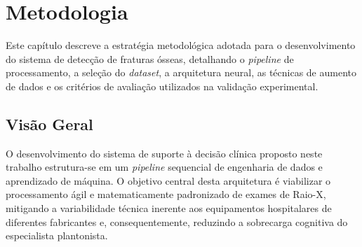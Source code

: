 \documentclass[12pt,oneside,a4paper,chapter=TITLE,section=TITLE,sumario=tradicional]{abntex2}
\begin{document}
\begin{table}[H]
\centering
\caption{COMPARAÇÃO DE TRABALHOS RELACIONADOS COM FOCO EM FRATURAS E DADOS DICOM}
\label{tab:trabalhos_resumidos}
\end{table}

\chapter{Metodologia}
\label{cap:metodologia}

Este capítulo descreve a estratégia metodológica adotada para o desenvolvimento do sistema de detecção de fraturas ósseas, detalhando o \textit{pipeline} de processamento, a seleção do \textit{dataset}, a arquitetura neural, as técnicas de aumento de dados e os critérios de avaliação utilizados na validação experimental.

\section{Visão Geral}

O desenvolvimento do sistema de suporte à decisão clínica proposto neste trabalho estrutura-se em um \textit{pipeline} sequencial de engenharia de dados e aprendizado de máquina. O objetivo central desta arquitetura é viabilizar o processamento ágil e matematicamente padronizado de exames de Raio-X, mitigando a variabilidade técnica inerente aos equipamentos hospitalares de diferentes fabricantes e, consequentemente, reduzindo a sobrecarga cognitiva do especialista plantonista.
\end{document}
